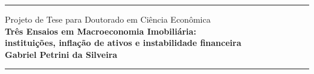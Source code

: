 \documentclass[
12pt,				%
oneside,			%
a4paper,		%
english,			%
brazil,				%
]{article}
\begin{document}
\begin{center}
\rule{\textwidth}{1.2pt}
	Projeto de Tese para Doutorado em Ciência Econômica\\
	\textbf{\Large{Três Ensaios em Macroeconomia Imobiliária: \\\large{instituições, inflação de ativos e instabilidade financeira}}}\\
	\textbf{Gabriel Petrini da Silveira}
\rule{\textwidth}{1.2pt}
\end{center}
\end{document}
